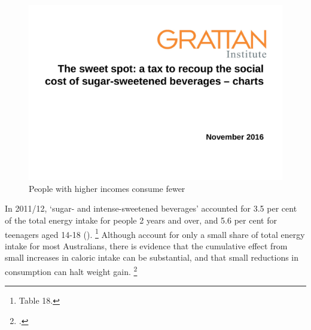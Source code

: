 \documentclass[embargoed]{grattan}
\begin{document}
\begin{figure}
\caption{People with higher incomes consume fewer \SSBs{}}\label{fig:people-higher-incomes-consumer-fewer-SSBs}

\includegraphics[page=8]{atlas/ObesityCharts}


\end{figure}



In 2011/12, `sugar- and intense-sweetened beverages' accounted for 3.5 per cent of the total energy intake for people 2 years and over, and 5.6 per cent for teenagers aged 14-18 ().%
\footnote{\textcite{ABS20144364055007AustralianHealth} Table 18.} Although \SSBs{} account for only a small share of total energy intake for most Australians, there is evidence that the cumulative effect from small increases in caloric intake can be substantial, and that small reductions in consumption can halt weight gain.%
\footcites{Fletcher2011Aresoftdrink}{Cutler2003WhyhaveAmericans}
\end{document}
